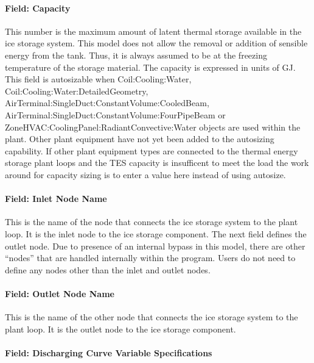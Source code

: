 \paragraph{Field: Capacity}\label{field-capacity-1-000}

This number is the maximum amount of latent thermal storage available in the ice storage system. This model does not allow the removal or addition of sensible energy from the tank. Thus, it is always assumed to be at the freezing temperature of the storage material. The capacity is expressed in units of GJ. This field is autosizable when Coil:Cooling:Water, Coil:Cooling:Water:DetailedGeometry, AirTerminal:SingleDuct:ConstantVolume:CooledBeam, AirTerminal:SingleDuct:ConstantVolume:FourPipeBeam or ZoneHVAC:CoolingPanel:RadiantConvective:Water objects are used within the plant. Other plant equipment have not yet been added to the autosizing capability. If other plant equipment types are connected to the thermal energy storage plant loops and the TES capacity is insufficent to meet the load the work around for capacity sizing is to enter a value here instead of using autosize.

\paragraph{Field: Inlet Node Name}\label{field-inlet-node-name-1-001}

This is the name of the node that connects the ice storage system to the plant loop. It is the inlet node to the ice storage component. The next field defines the outlet node. Due to presence of an internal bypass in this model, there are other ``nodes'' that are handled internally within the program. Users do not need to define any nodes other than the inlet and outlet nodes.

\paragraph{Field: Outlet Node Name}\label{field-outlet-node-name-1-002}

This is the name of the other node that connects the ice storage system to the plant loop. It is the outlet node to the ice storage component.

\paragraph{Field: Discharging Curve Variable Specifications}\label{field-discharging-curve-variable-specifications}


